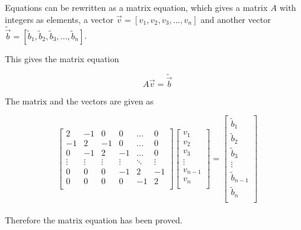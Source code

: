 \documentclass{article}
\begin{document}
    Equations can be rewritten as a matrix equation, which gives a matrix $A$ with integers as elements, a vector $\vec{v} = [v_1, v_2, v_3, ... , v_n]$ and another vector $\tilde{\vec{b}} = [\tilde{b}_1, \tilde{b}_2, \tilde{b}_3, ... , \tilde{b}_n]$.

    This gives the matrix equation

    \begin{equation*}
      A \vec{v} = \tilde{\vec{b}}
    \end{equation*}

    The matrix and the vectors are given as

    \begin{equation*}
      \begin{bmatrix}
          2 & -1 & 0 & 0 & \dots & 0 \\
          -1 & 2 & -1 & 0 & \dots & 0 \\
          0 & -1 & 2 & -1 & \dots & 0 \\
          \vdots & \vdots & \vdots & \vdots & \ddots & \vdots \\
              0 & 0 & 0 & -1 & 2 & -1 \\
              0 & 0 & 0 & 0 & -1 & 2 \\
      \end{bmatrix}
      \begin{bmatrix}
          v_1 \\
          v_2 \\
          v_3 \\
          \vdots \\
          v_{n-1} \\
          v_n \\
      \end{bmatrix}
      =
      \begin{bmatrix}
          \tilde{b}_1 \\
          \tilde{b}_2 \\
          \tilde{b}_3 \\
          \vdots \\
          \tilde{b}_{n-1} \\
          \tilde{b}_n \\
      \end{bmatrix}
    \end{equation*} \\

    Therefore the matrix equation has been proved. \\
\end{document}
